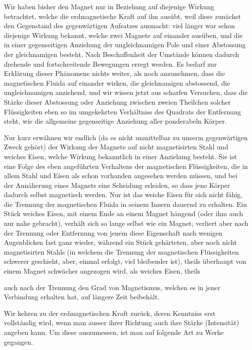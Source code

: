 Wir haben bisher den Magnet nur in Beziehung auf diejenige Wirkung betrachtet, welche die erdmagnetische Kraft auf ihn ausübt, weil diese zunächst den Gegenstand des gegenwärtigen Aufsatzes ausmacht: viel länger war schon diejenige Wirkung bekannt, welche zwei Magnete auf einander ausüben, und die in einer gegenseitigen Anziehung der ungleichnamigen Pole und einer Abstossung der gleichnamigen besteht. Nach Beschaffenheit der Umstände können dadurch drehende und fortschreitende Bewegungen erregt werden. Es bedarf zur Erklärung dieser Phänomene nichts weiter, als noch anzunehmen, dass die magnetischen Fluida auf einander wirken, die gleichnamigen abstossend, die ungleichnamigen anziehend, und wir wissen jetzt aus scharfen Versuchen, dass die Stärke dieser Abstossung oder Anziehung zwischen zweien Theilchen solcher Flüssigkeiten eben so im umgekehrten Verhältniss des Quadrats der Entfernung steht, wie die allgemeine gegenseitige Anziehung aller ponderabeln Körper.

Nur kurz erwähnen wir endlich (da es nicht unmittelbar zu unserm gegenwärtigen Zweck gehört) der Wirkung der Magnete auf nicht magnetisirten Stahl und weiches Eisen, welche Wirkung bekanntlich in einer Anziehung besteht. Sie ist eine Folge des eben angeführten Verhaltens der magnetischen Flüssigkeiten, die in allem Stahl und Eisen als schon vorhanden angesehen werden müssen, und bei der Annäherung eines Magnets eine Scheidung erleiden, so dass jene Körper dadurch selbst magnetisch werden. Nur ist das weiche Eisen für sich nicht fähig, die Trennung der magnetischen Fluida in seinem Innern dauernd zu erhalten. Ein Stück weiches Eisen, mit einem Ende an einem Magnet hängend (oder ihm auch nur nahe gebracht), verhält sich so lange selbst wie ein Magnet, verliert aber nach der Trennung oder Entfernung von jenem diese Eigenschaft nach wenigen Augenblicken fast ganz wieder, während ein Stück gehärteten, aber noch nicht magnetisirten Stahls (in welchem die Trennung der magnetischen Flüssigkeiten schwerer geschieht, aber, einmal erfolgt, viel bleibender ist), theils überhaupt von einem Magnet schwächer angezogen wird, als weiches Eisen, theils
\par{}
\par\clearpage
{}
\noindent auch nach der Trennung den Grad von Magnetismus, welchen es in jener Verbindung erhalten hat, auf längere Zeit beibehält.

Wir kehren zu der erdmagnetischen Kraft zurück, deren Kenntniss erst vollständig wird, wenn man ausser ihrer Richtung auch ihre Stärke (Intensität) angeben kann. Um diese auszumessen, ist man auf folgende Art zu Werke gegangen.

